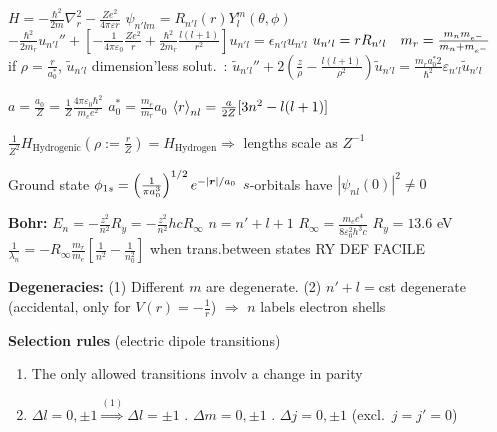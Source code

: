 
\begin{squishlist}
    \item $H = - \frac{\hbar^2}{2m}\nabla^2_r - \frac{Z e^2}{4 \pi \varepsilon r} $ \qquad 
    $\psi_{n'lm} = R_{n'l}(r) Y_l^m(\theta, \phi)$ \\
    $ - \frac{\hbar^2}{2m_r}u_{n'l}'' + \left[-\frac{1}{4\pi \varepsilon_0}\frac{Ze^2}{r} + \frac{\hbar^2}{2m_r}\frac{l(l+1)}{r^2}\right] u_{n'l} = \epsilon_{n'l}u_{n'l}$ \quad $u_{n'l} = r R_{n'l} \quad m_r = \frac{m_nm_{e^-}}{m_n + m_{e^-}}$ \\
    if $\rho = \frac{r}{a_0^*}$, $\tilde{u}_{n'l}$ dimension'less solut.\ : $\tilde{u}_{n'l}'' + 2(\frac{z}{\rho} - \frac{l(l+1)}{\rho^2})\tilde{u}_{n'l} = \frac{m_r a_0^*2}{\hbar^2} \varepsilon_{n'l} \tilde{u}_{n'l}$
    \item $ a = \frac{a_0}{Z} = \frac{1}{Z} \frac{4\pi \varepsilon_0 \hbar^2}{m_e e^2}$ \quad $a_0^* = \frac{m_e}{m_r}a_0$
    \squishsep $\braket{r}_{nl} = \frac{a}{2Z} [3n^2 - l(l+1)]$
    \item $\frac{1}{Z^2}H_{\text{Hydrogenic}}\left(\rho:=\frac{r}{Z}\right) = H_{\text{Hydrogen}} \Longrightarrow$ lengths scale as $Z^{-1}$
    \item Ground state $\phi_{1s} = \left(\frac{1}{\pi a_0^3}\right)^{1/2} e^{-|\bm{r}|/a_0} $
    \squishsep $s$-orbitals have $\left|\psi_{nl}(0)\right|^2 \neq 0$
    \item \textbf{Bohr:} $E_n = - \frac{z^2}{n^2} R_y = - \frac{z^2}{n^2}h c R_{\infty}$ \quad $n = n' + l + 1$ \quad $R_{\infty} = \frac{m_e e^4}{8 \varepsilon_0^2 h^3 c}$ \quad $R_y = 13.6$ eV\\
     $\frac{1}{\lambda_n} = - R_{\infty} \frac{m_r}{m_e} \left[ \frac{1}{n^2} - \frac{1}{n_0^2}\right]$ when trans.between states \quad RY DEF FACILE
    
    \item \textbf{Degeneracies:} (1) Different $m$ are degenerate. (2) $n'+l =$cst degenerate (accidental, only for $V(r) = -\frac{1}{r}$) $\Longrightarrow$ $n$ labels electron shells
    

    \item \textbf{Selection rules} (electric dipole transitions)
        \begin{enumerate}
            \item The only allowed transitions involv a change in parity
            \item $\Delta l = 0, \pm1 \overset{(1)}{\Longrightarrow} \Delta l = \pm 1$ . $\Delta m = 0, \pm 1$ . $\Delta j = 0,\pm 1$ (excl.\ $j=j'=0$)
        \end{enumerate}
    

\end{squishlist}
